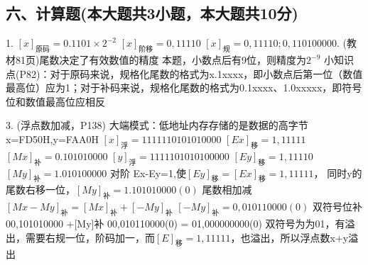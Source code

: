\subsection{六、计算题(本大题共3小题，本大题共10分)}
1.\newline
$[x]_{\mbox{原码}} = 0.1101 \times 2^{-2}$\newline
$[x]_{\mbox{阶移}} = 0,11110$\newline
$[x]_{\mbox{规}} = 0,11110;0,110100000$.\newline
(教材81页)尾数决定了有效数值的精度\newline
本题，小数点后有9位，则精度为$2^{-9}$\newline
小知识点(P82)：对于原码来说，规格化尾数的格式为x.1xxxx，即小数点后第一位（数值最高位）应为1；对于补码来说，规格化尾数的格式为0.1xxxx、1.0xxxxx，即符号位和数值最高位应相反\newline


3.\newline
(浮点数加减，P138)\newline
大端模式：低地址内存存储的是数据的高字节\newline
x=FD50H,y=FAA0H\newline
$[x]_{\mbox{浮}}=1111 1101 0101 0000$\newline
$[Ex]_{\mbox{移}}=1,11111$\newline
$[Mx]_{\mbox{补}}=0.101010000$\newline
$[y]_{\mbox{浮}}=1111 1010 1010 0000$\newline
$[Ey]_{\mbox{移}}=1,11110$\newline
$[My]_{\mbox{补}}=1.010100000$\newline
对阶 Ex-Ey=1,使$[Ey]_{\mbox{移}}=[Ex]_{\mbox{移}}=1,11111$，\newline
同时y的尾数右移一位，$[My]_{\mbox{补}}=1.101010000(0)$\newline
尾数相加减 $[Mx-My]_{\mbox{补}}=[Mx]_{\mbox{补}}+[-My]_{\mbox{补}}$\newline
$[-My]_{\mbox{补}}=0,010110000(0)$\newline
双符号位\newline
[Mx]补   00,101010000\newline
+[My]补  00,010110000(0)\newline
=        01,000000000(0)\newline
双符号为为01，有溢出，需要右规一位，阶码加一，而$[E]_{\mbox{移}}=1,11111$，也溢出，所以浮点数x+y溢出\newline

